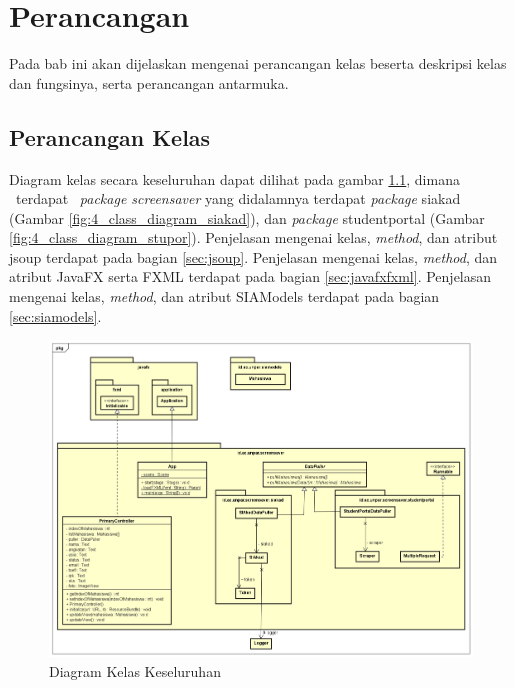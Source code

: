 \chapter{Perancangan}
\label{chap:perancangan}

Pada bab ini akan dijelaskan mengenai perancangan kelas beserta deskripsi kelas dan fungsinya, serta perancangan antarmuka.

\section{Perancangan Kelas}
\label{perancanganKelas}

Diagram kelas secara keseluruhan dapat dilihat pada gambar \ref{fig:4_class_diagram}, dimana ~terdapat ~\textit{package screensaver} yang didalamnya terdapat \textit{package} siakad (Gambar \ref{fig:4_class_diagram_siakad}), dan \textit{package} studentportal (Gambar \ref{fig:4_class_diagram_stupor}).
Penjelasan mengenai kelas, \textit{method}, dan atribut jsoup terdapat pada bagian \ref{sec:jsoup}.
Penjelasan mengenai kelas, \textit{method}, dan atribut JavaFX serta FXML terdapat pada bagian \ref{sec:javafxfxml}. Penjelasan mengenai kelas, \textit{method}, dan atribut SIAModels terdapat pada bagian \ref{sec:siamodels}. 

\begin{figure}[h]
	\centering
	\includegraphics[scale=0.37]{Gambar/ClassDiagram.png}
	\caption{Diagram Kelas Keseluruhan}
	\label{fig:4_class_diagram}
\end{figure}

